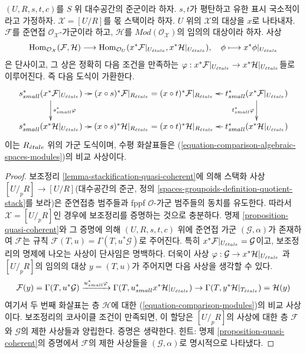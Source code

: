 \begin{lemma}
\label{lemma-map-from-quasi-coherent}
$(U, R, s, t, c)$를 $S$ 위 대수공간의 준군이라 하자.
$s, t$가 평탄하고 유한 표시 국소적이라고 가정하자.
$\mathcal{X} = [U/R]$를 몫 스택이라 하자.
$U$ 위의 $\mathcal{X}$의 대상을 $x$로 나타내자.
$\mathcal{F}$를 준연접 $\mathcal{O}_\mathcal{X}$-가군이라 하고,
$\mathcal{H}$를 $\textit{Mod}(\mathcal{O}_\mathcal{X})$의
임의의 대상이라 하자. 사상
$$
\mathop{\mathrm{Hom}}\nolimits_{\mathcal{O}_\mathcal{X}}(\mathcal{F}, \mathcal{H})
\longrightarrow
\mathop{\mathrm{Hom}}\nolimits_{\mathcal{O}_U}(x^*\mathcal{F}|_{U_{\acute{e}tale}},
x^*\mathcal{H}|_{U_{\acute{e}tale}}),
\quad
\phi \longmapsto x^*\phi|_{U_{\acute{e}tale}}
$$
은 단사이고, 그 상은 정확히 다음 조건을 만족하는
$\varphi : x^*\mathcal{F}|_{U_{\acute{e}tale}} \to
x^*\mathcal{H}|_{U_{\acute{e}tale}}$들로 이루어진다. 즉 다음 도식이 가환한다.
$$
\xymatrix@C=0.8em{
s_{small}^*(x^*\mathcal{F}|_{U_\etale})
\ar[r] \ar[d]^{s_{small}^*\varphi} &
(x \circ s)^*\mathcal{F}|_{R_\etale} =
(x \circ t)^*\mathcal{F}|_{R_\etale} &
t_{small}^*(x^*\mathcal{F}|_{U_\etale})
\ar[l] \ar[d]_{t_{small}^*\varphi} \\
s_{small}^*(x^*\mathcal{H}|_{U_\etale})
\ar[r] &
(x \circ s)^*\mathcal{H}|_{R_\etale} =
(x \circ t)^*\mathcal{H}|_{R_\etale} &
t_{small}^*(x^*\mathcal{H}|_{U_\etale})
\ar[l]
}
$$
이는 $R_{\acute{e}tale}$ 위의 가군 도식이며, 수평 화살표들은
(\ref{equation-comparison-algebraic-spaces-modules})의 비교 사상이다.
\end{lemma}

\begin{proof}
보조정리 \ref{lemma-stackification-quasi-coherent}에 의해 스택화 사상
$[U/_{\!p}R] \to [U/R]$(대수공간의 준군, 정의
\ref{spaces-groupoids-definition-quotient-stack}를 보라)은
준연접층 범주들과 fppf $\mathcal{O}$-가군 범주들의 동치를 유도한다.
따라서 $\mathcal{X} = [U/_{\!p}R]$인 경우에 보조정리를 증명하는
것으로 충분하다. 명제 \ref{proposition-quasi-coherent}와 그 증명에
의해 $(U, R, s, t, c)$ 위에 준연접 가군
$(\mathcal{G}, \alpha)$가 존재하여 $\mathcal{F}$는 규칙
$\mathcal{F}(T, u) = \Gamma(T, u^*\mathcal{G})$로 주어진다.
특히 $x^*\mathcal{F}|_{U_{\acute{e}tale}} = \mathcal{G}$이고,
보조정리의 명제에 나오는 사상이 단사임은 명백하다.
더욱이 사상
$\varphi : \mathcal{G} \to x^*\mathcal{H}|_{U_{\acute{e}tale}}$
과 $[U/_{\!p}R]$의 임의의 대상 $y = (T, u)$가 주어지면
다음 사상을 생각할 수 있다.
$$
\mathcal{F}(y) = \Gamma(T, u^*\mathcal{G})
\xrightarrow{u_{small}^*\varphi}
\Gamma(T, u_{small}^*x^*\mathcal{H}|_{U_{\acute{e}tale}})
\rightarrow
\Gamma(T, y^*\mathcal{H}|_{T_{\acute{e}tale}}) = \mathcal{H}(y)
$$
여기서 두 번째 화살표는 층 $\mathcal{H}$에 대한
(\ref{equation-comparison-modules})의 비교 사상이다.
보조정리의 코사이클 조건이 만족되면, 이 할당은
$[U/_{\!p}R]$의 사상에 대한 층 $\mathcal{F}$와 $\mathcal{G}$의
제한 사상들과 양립한다. 증명은 생략한다. 힌트: 명제
\ref{proposition-quasi-coherent}의 증명에서 $\mathcal{F}$의 제한
사상들을 $(\mathcal{G}, \alpha)$로 명시적으로 나타냈다.
\end{proof}







